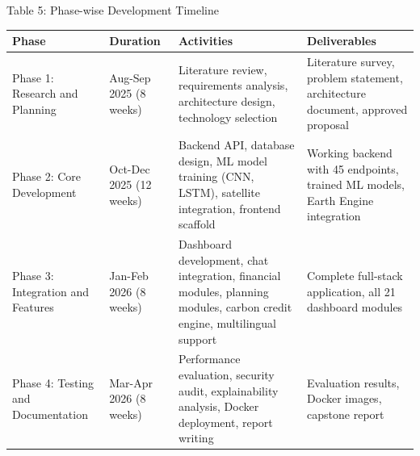 \documentclass[12pt, a4paper]{report}
\begin{document}
Table 5: Phase-wise Development Timeline

\begin{table}[htbp]
\centering
\small
\begin{tabularx}{\textwidth}{|X|X|X|X|}
\hline
Phase & Duration & Activities & Deliverables \\
\hline
Phase 1: Research and Planning & Aug-Sep 2025 (8 weeks) & Literature review, requirements analysis, architecture design, technology selection & Literature survey, problem statement, architecture document, approved proposal \\
Phase 2: Core Development & Oct-Dec 2025 (12 weeks) & Backend API, database design, ML model training (CNN, LSTM), satellite integration, frontend scaffold & Working backend with 45 endpoints, trained ML models, Earth Engine integration \\
Phase 3: Integration and Features & Jan-Feb 2026 (8 weeks) & Dashboard development, chat integration, financial modules, planning modules, carbon credit engine, multilingual support & Complete full-stack application, all 21 dashboard modules \\
Phase 4: Testing and Documentation & Mar-Apr 2026 (8 weeks) & Performance evaluation, security audit, explainability analysis, Docker deployment, report writing & Evaluation results, Docker images, capstone report \\
\hline
\end{tabularx}
\end{table}
\end{document}
